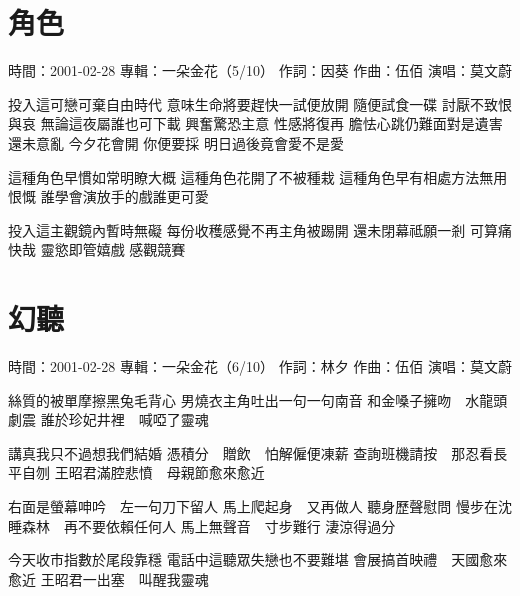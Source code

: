 \documentclass[UTF8,a4paper,oneside,twocolumn,12pt]{ctexbook}
\newcommand{\infopair}[2]{\textbullet #1：#2}
\newcommand{\zc}[1][伍佰]{\infopair{作詞}{#1}}
\newcommand{\zq}[1][伍佰]{\infopair{作曲}{#1}}
\newcommand{\zj}[1]{\infopair{專輯}{#1}}
\newcommand{\sj}[1]{\infopair{時間}{#1}}
\newenvironment{info}{\begin{flushleft}\kaishu
	}
	{\end{flushleft}\normalsize\yahei\par}
\newenvironment{lyric}{
	}
{}
\begin{document}
\section{角色}
\begin{info}
	\sj{2001-02-28}
	\zj{一朵金花（5/10）}
	\zc[因葵]
	\zq
	\infopair{演唱}{莫文蔚}
\end{info}
\begin{lyric}
	投入這可戀可棄自由時代
	意味生命將要趕快一試便放開
	隨便試食一碟 討厭不致恨與哀
	無論這夜屬誰也可下載
	興奮驚恐主意 性感將復再
	膽怯心跳仍難面對是遺害
	還未意亂 今夕花會開 你便要採
	明日過後竟會愛不是愛

	這種角色早慣如常明瞭大概
	這種角色花開了不被種栽
	這種角色早有相處方法無用恨慨
	誰學會演放手的戲誰更可愛

	投入這主觀鏡內暫時無礙
	每份收穫感覺不再主角被踢開
	還未閉幕祗願一剎 可算痛快哉
	靈慾即管嬉戲 感觀競賽
\end{lyric}

\section{幻聽}
\begin{info}
	\sj{2001-02-28}
	\zj{一朵金花（6/10）}
	\zc[林夕]
	\zq
	\infopair{演唱}{莫文蔚}
\end{info}
\begin{lyric}
	絲質的被單摩擦黑兔毛背心
	男燒衣主角吐出一句一句南音
	和金嗓子擁吻　水龍頭劇震
	誰於珍妃井裡　喊啞了靈魂

	講真我只不過想我們結婚
	憑積分　贈飲　怕解僱便凍薪
	查詢班機請按　那忍看長平自刎
	王昭君滿腔悲憤　母親節愈來愈近

	右面是螢幕呻吟　左一句刀下留人
	馬上爬起身　又再做人
	聽身歷聲慰問
	慢步在沈睡森林　再不要依賴任何人
	馬上無聲音　寸步難行
	淒涼得過分

	今天收市指數於尾段靠穩
	電話中這聽眾失戀也不要難堪
	會展搞首映禮　天國愈來愈近
	王昭君一出塞　叫醒我靈魂
\end{lyric}
\end{document}
